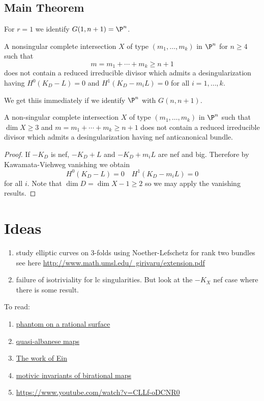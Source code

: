 \documentclass[12pt]{article}
\theoremstyle{plain}
\begin{document}
\subsection{Main Theorem}

For $r = 1$ we identify $G(1, n+1) = \P^n$. 

\begin{prop}
A nonsingular complete intersection $X$ of type $(m_1, \dots, m_k)$ in $\P^n$ for $n \ge 4$ such that
\[ m = m_1 + \cdots + m_k \ge n + 1 \]
does not contain a reduced irreducible divisor which admits a desingularization having $H^0(K_D - L) = 0$ and $H^1(K_D - m_i L) = 0$ for all $i = 1,\dots, k$. 
\end{prop}

We get thiis immediately if we identify $\P^n$ with $G(n, n+1)$. 

\begin{theorem}
A non-singular complete intersection $X$ of type $(m_1, \dots, m_k)$ in $\P^n$ such that $\dim{X} \ge 3$ and $m = m_1 + \cdots + m_k \ge n + 1$ does not contain a reduced irreducible divisor which admits a desingularization having nef anticanonical bundle.
\end{theorem}

\begin{proof}
If $-K_D$ is nef, $-K_D + L$ and $-K_D + m_i L$ are nef and big. Therefore by Kawamata-Viehweg vanishing we obtain
\[ H^0(K_D - L) = 0 \quad H^1(K_D - m_i L) = 0 \]
for all $i$. Note that $\dim{D} = \dim{X} - 1 \ge 2$ so we may apply the vanishing results. 
\end{proof}

\section{Ideas}

\begin{enumerate}
\item study elliptic curves on 3-folds using Noether-Lefschetz for rank two bundles see here \href{Ravindra and Tripathi}{http://www.math.umsl.edu/~girivaru/extension.pdf}
\item failure of isotriviality for lc singularities. But look at the $-K_X$ nef case  where there is some result.
\end{enumerate}

To read:

\begin{enumerate}
\item \href{https://link.springer.com/article/10.1007/s00222-023-01234-0}{phantom on a rational surface}
\item \href{https://arxiv.org/abs/2402.04595}{quasi-albanese maps}
\item \href{https://www.math.stonybrook.edu/~roblaz/Reprints/Lazarsfeld.Rmks.Work.Ein.pdf}{The work of Ein}
\item \href{https://arxiv.org/pdf/2207.07389}{motivic invariants of birational maps}
\item \href{Talk by Zvi Ran}{https://www.youtube.com/watch?v=CLLf-oDCNR0}
\end{enumerate}
\end{document}
